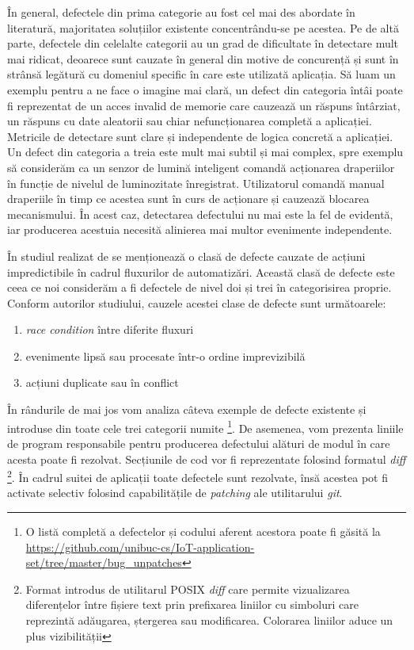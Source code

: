 În general, defectele din prima categorie au fost cel mai des abordate în literatură, majoritatea soluțiilor existente concentrându-se pe acestea. Pe de altă parte, defectele din celelalte categorii au un grad de dificultate în detectare mult mai ridicat, deoarece sunt cauzate în general din motive de concurență și sunt în strânsă legătură cu domeniul specific în care este utilizată aplicația. Să luam un exemplu pentru a ne face o imagine mai clară, un defect din categoria întâi poate fi reprezentat de un acces invalid de memorie care cauzează un răspuns întârziat, un răspuns cu date aleatorii sau chiar nefuncționarea completă a aplicației. Metricile de detectare sunt clare și independente de logica concretă a aplicației. Un defect din categoria a treia este mult mai subtil și mai complex, spre exemplu să considerăm ca un senzor de lumină inteligent comandă acționarea draperiilor în funcție de nivelul de luminozitate înregistrat. Utilizatorul comandă manual draperiile în timp ce acestea sunt în curs de acționare și cauzează blocarea mecanismului. În acest caz, detectarea defectului nu mai este la fel de evidentă, iar producerea acestuia necesită alinierea mai multor evenimente independente. 

În studiul realizat de \cite{Zhou2021} se menționează o clasă de defecte cauzate de acțiuni impredictibile în cadrul fluxurilor de automatizări. Această clasă de defecte este ceea ce noi considerăm a fi defectele de nivel doi și trei în categorisirea proprie. Conform autorilor studiului, cauzele acestei clase de defecte sunt următoarele:

\begin{enumerate}
    \item \textit{race condition} între diferite fluxuri
    \item evenimente lipsă sau procesate într-o ordine imprevizibilă
    \item acțiuni duplicate sau în conflict
\end{enumerate}


În rândurile de mai jos vom analiza câteva exemple de defecte existente și introduse din toate cele trei categorii numite \footnote{O listă completă a defectelor și codului aferent acestora poate fi găsită la \url{https://github.com/unibuc-cs/IoT-application-set/tree/master/bug_unpatches}}. De asemenea, vom prezenta liniile de program responsabile pentru producerea defectului alături de modul în care acesta poate fi rezolvat. Secțiunile de cod vor fi reprezentate folosind formatul \textit{diff} \footnote{Format introdus de utilitarul POSIX \textit{diff} care permite vizualizarea diferențelor între fișiere text prin prefixarea liniilor cu simboluri care reprezintă adăugarea, ștergerea sau modificarea. Colorarea liniilor aduce un plus vizibilității}. În cadrul suitei de aplicații toate defectele sunt rezolvate, însă acestea pot fi activate selectiv folosind capabilitățile de \textit{patching} ale utilitarului \textit{git}.

